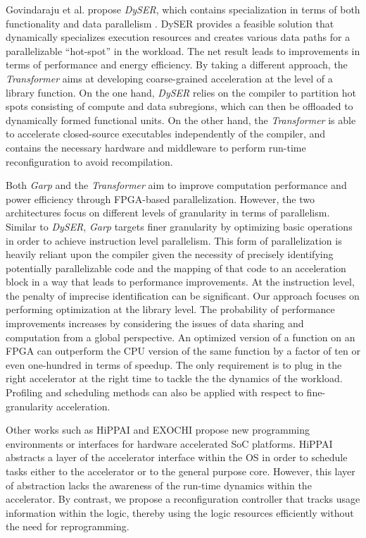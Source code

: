 Govindaraju et al. propose {\em DySER}, which contains specialization in terms of both functionality and
data parallelism \cite{Govindaraju:2012fn,Govindaraju:HPCA11}. DySER
provides a feasible solution that dynamically specializes execution
resources and creates various data paths for a parallelizable
``hot-spot'' in the workload. The net result leads to improvements in terms of performance and energy
efficiency. By taking a different approach, the {\em Transformer} aims at developing
coarse-grained acceleration at the level of a library function. On the one hand,
{\em DySER} relies on the compiler to partition hot spots consisting of compute and
data subregions, which can then be offloaded to dynamically formed functional
units. On the other hand, the {\em Transformer} is able to accelerate closed-source executables independently of the compiler, and contains
the necessary hardware and middleware to perform run-time reconfiguration to avoid
recompilation.

Both {\em Garp} \cite{Garp:1997,Garp:2000} and the {\em Transformer} aim to improve computation performance and power
efficiency through FPGA-based parallelization. However, the two
architectures focus on different levels of granularity in terms of parallelism. Similar
to {\em DySER}, {\em Garp} targets finer granularity by
optimizing basic operations in order to achieve instruction level
parallelism. This form of parallelization is heavily reliant upon the compiler given the necessity of
precisely identifying potentially parallelizable code and the mapping of that code
to an acceleration block in a way that leads to performance improvements.
At the instruction level, the penalty of imprecise identification can be significant.
Our approach focuses on performing optimization at the library level.
The probability of performance improvements increases by considering the issues of data sharing and computation from a global
perspective. 
An optimized version of a function on an FPGA can outperform the CPU version of the same
function by a factor of ten or even one-hundred in terms of speedup. The only requirement is to 
plug in the right accelerator at the right time to tackle the
the dynamics of the workload. Profiling and scheduling methods can also be applied with respect to fine-granularity acceleration.

Other works such as HiPPAI \cite{Stillwell:2009if} and EXOCHI
\cite{Wang:2007bc} propose new programming environments or interfaces
for hardware accelerated SoC platforms. HiPPAI abstracts a layer of the
accelerator interface within the OS in order to schedule tasks either to the
accelerator or to the general purpose core. However, this layer of
abstraction lacks the awareness of the run-time dynamics within the
accelerator. By contrast, we propose a reconfiguration controller that
 tracks usage information within the logic, thereby using 
the logic resources efficiently without the need for reprogramming. 


